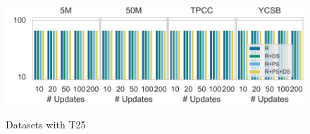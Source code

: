 \begin{figure}
  \begin{minipage}[b]{1\linewidth}
    $\,$\\[-5mm]
    \includegraphics[width=1\linewidth,trim=0 0 0 0, clip]{imgs/felix_t25_optimizations.pdf}\\
    \vspace{-8mm}
  \caption{Datasets with T25}
  \label{fig:Relation Size2}
  \end{minipage}
\end{figure}


